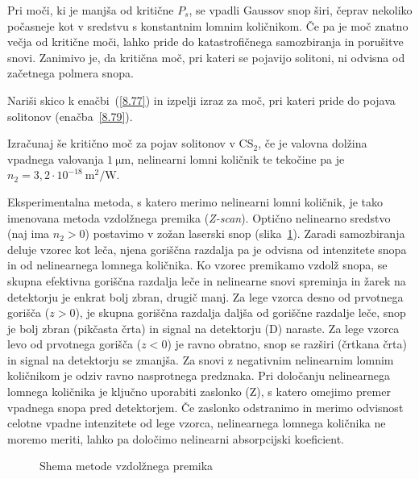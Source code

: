 Pri moči, ki je manjša od kritične $P_s$, se vpadli Gaussov snop širi, 
čeprav nekoliko počasneje kot v sredstvu s konstantnim lomnim količnikom. 
Če pa je moč znatno večja od kritične moči, lahko
pride do katastrofičnega samozbiranja in porušitve snovi.
Zanimivo je, da kritična moč, pri kateri se pojavijo solitoni, 
ni odvisna od začetnega polmera snopa.

\begin{definition}
Nariši skico k enačbi~(\ref{8.77}) in izpelji izraz za moč, pri kateri pride do pojava
solitonov (enačba~\ref{8.79}). 

Izračunaj še kritično moč za pojav solitonov v CS$_{2}$,
če je valovna dolžina vpadnega valovanja $1~\si{\micro\metre}$, 
nelinearni lomni količnik te tekočine pa je 
 $n_{2}=3,2 \cdot 10^{-18}~\si{\metre^2/\watt}$. 
\end{definition}

\begin{remark}
Eksperimentalna metoda, 
s katero merimo nelinearni 
lomni količnik, je tako imenovana
metoda vzdolžnega premika ({\it Z-scan}). Optično nelinearno sredstvo (naj ima $n_2>0$)
postavimo v zožan laserski snop (slika~\ref{fig:zscan}). 
Zaradi samozbiranja deluje vzorec kot leča, njena goriščna razdalja
pa je odvisna od intenzitete snopa in od nelinearnega lomnega količnika. Ko vzorec 
premikamo vzdolž snopa, se skupna efektivna goriščna razdalja leče in nelinearne snovi 
spreminja in žarek na detektorju je enkrat bolj zbran, drugič manj. 
Za lege vzorca desno od prvotnega gorišča ($z>0$), je skupna goriščna
razdalja daljša od goriščne razdalje leče, snop je bolj zbran (pikčasta črta) in signal 
na detektorju (D) naraste. Za lege vzorca levo
od prvotnega gorišča ($z<0$) je ravno obratno, snop se razširi (črtkana črta) in 
signal na detektorju se zmanjša. Za snovi z negativnim nelinearnim lomnim količnikom
je odziv ravno nasprotnega predznaka. Pri določanju nelinearnega lomnega količnika je
ključno uporabiti zaslonko (Z), s katero omejimo premer vpadnega snopa pred detektorjem. 
Če zaslonko odstranimo in merimo 
odvisnost celotne vpadne intenzitete od lege vzorca, nelinearnega lomnega količnika 
ne moremo meriti, lahko pa določimo nelinearni absorpcijski koeficient. 

\begin{figure}[h!]
\raggedleft 
\def\svgwidth{130truemm} 

\caption{Shema metode vzdolžnega premika}
\label{fig:zscan}
\end{figure}
\end{remark}

